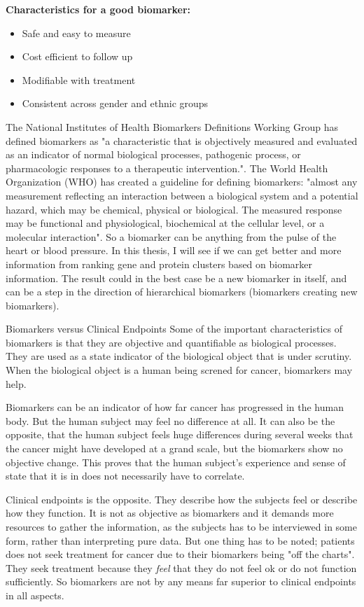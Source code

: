 \textbf{Characteristics for a good biomarker:}
\begin{itemize}
    \item Safe and easy to measure
    \item Cost efficient to follow up
    \item Modifiable with treatment
    \item Consistent across gender and ethnic groups
\end{itemize}

The National Institutes of Health Biomarkers Definitions Working Group has
defined biomarkers as "a characteristic that is objectively measured and
evaluated as an indicator of normal biological processes, pathogenic process, or
pharmacologic responses to a therapeutic intervention.". The World Health
Organization (WHO) has created a guideline for defining biomarkers: "almost any
measurement reflecting an interaction between a biological system and a
potential hazard, which may be chemical, physical or biological. The measured
response may be functional and physiological, biochemical at the cellular level,
or a molecular interaction". So a biomarker can be anything from the pulse of
the heart or blood pressure. In this thesis, I will see if we can get better and
more information from ranking gene and protein clusters based on biomarker
information. The result could in the best case be a new biomarker in itself, and
can be a step in the direction of hierarchical biomarkers (biomarkers creating
new biomarkers).


Biomarkers versus Clinical Endpoints Some of the important characteristics of
biomarkers is that they are objective and quantifiable as biological processes.
They are used as a state indicator of the biological object that is under
scrutiny. When the biological object is a human being screned for cancer,
biomarkers may help.

Biomarkers can be an indicator of how far cancer has progressed in the human
body. But the human subject may feel no difference at all. It can also be the
opposite, that the human subject feels huge differences during several weeks
that the cancer might have developed at a grand scale, but the biomarkers show
no objective change. This proves that the human subject's experience and sense
of state that it is in does not necessarily have to correlate.

Clinical endpoints is the opposite. They describe how the subjects feel or
describe how they function. It is not as objective as biomarkers and it demands
more resources to gather the information, as the subjects has to be interviewed
in some form, rather than interpreting pure data. But one thing has to be noted;
patients does not seek treatment for cancer due to their biomarkers being "off
the charts". They seek treatment because they \textit{feel} that they do not
feel ok or do not function sufficiently. So biomarkers are not by any means far
superior to clinical endpoints in all aspects.

